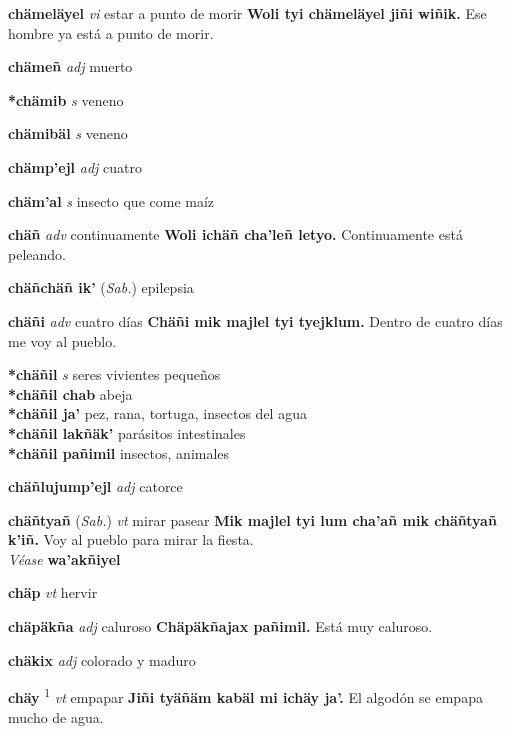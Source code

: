 \documentclass[10pt]{scrbook}
\newcommand{\entry}[1]{\textbf{#1}}
\newcommand{\defsuperscript}[1]{\textsuperscript{#1}}
\newcommand{\partofspeech}[1]{\textit{#1}}
\newcommand{\spanishtranslation}[1]{#1}
\newcommand{\cholexample}[1]{\textbf{#1}}
\newcommand{\exampletranslation}[1]{#1}
\newcommand{\alsosee}[1]{\\\textit{Véase} \textbf{#1}}
\newcommand{\relevantdialect}[1]{(\textit{#1})}
\newcommand{\secondaryentry}[1]{\\\textbf{#1}}
\newcommand{\secondtranslation}[1]{#1}
\begin{document}
\begin{multicols}{2}
\entry{chämeläyel}
\partofspeech{vi}
\spanishtranslation{estar a punto de morir}
\cholexample{Woli tyi chämeläyel jiñi wiñik.}
\exampletranslation{Ese hombre ya está a punto de morir.}

\entry{chämeñ}
\partofspeech{adj}
\spanishtranslation{muerto}

\entry{*chämib}
\partofspeech{s}
\spanishtranslation{veneno}

\entry{chämibäl}
\partofspeech{s}
\spanishtranslation{veneno}

\entry{chämp'ejl}
\partofspeech{adj}
\spanishtranslation{cuatro}

\entry{chäm'al}
\partofspeech{s}
\spanishtranslation{insecto que come maíz}

\entry{chäñ}
\partofspeech{adv}
\spanishtranslation{continuamente}
\cholexample{Woli ichäñ cha'leñ letyo.}
\exampletranslation{Continuamente está peleando.}

\entry{chäñchäñ ik'}
\relevantdialect{Sab.}
\spanishtranslation{epilepsia}

\entry{chäñi}
\partofspeech{adv}
\spanishtranslation{cuatro días}
\cholexample{Chäñi mik majlel tyi tyejklum.}
\exampletranslation{Dentro de cuatro días me voy al pueblo.}

\entry{*chäñil}
\partofspeech{s}
\spanishtranslation{seres vivientes pequeños}
\secondaryentry{*chäñil chab}
\secondtranslation{abeja}
\secondaryentry{*chäñil ja'}
\secondtranslation{pez, rana, tortuga, insectos del agua}
\secondaryentry{*chäñil lakñäk'}
\secondtranslation{parásitos intestinales}
\secondaryentry{*chäñil pañimil}
\secondtranslation{insectos, animales}

\entry{chäñlujump'ejl}
\partofspeech{adj}
\spanishtranslation{catorce}

\entry{chäñtyañ}
\relevantdialect{Sab.}
\partofspeech{vt}
\spanishtranslation{mirar}
\spanishtranslation{pasear}
\cholexample{Mik majlel tyi lum cha'añ mik chäñtyañ k'iñ.}
\exampletranslation{Voy al pueblo para mirar la fiesta.}
\alsosee{wa'akñiyel}

\entry{chäp}
\partofspeech{vt}
\spanishtranslation{hervir}

\entry{chäpäkña}
\partofspeech{adj}
\spanishtranslation{caluroso}
\cholexample{Chäpäkñajax pañimil.}
\exampletranslation{Está muy caluroso.}

\entry{chäkix}
\partofspeech{adj}
\spanishtranslation{colorado y maduro}

\entry{chäy}
\defsuperscript{1}
\partofspeech{vt}
\spanishtranslation{empapar}
\cholexample{Jiñi tyäñäm kabäl mi ichäy ja'.}
\exampletranslation{El algodón se empapa mucho de agua.}


\end{multicols}
\end{document}
